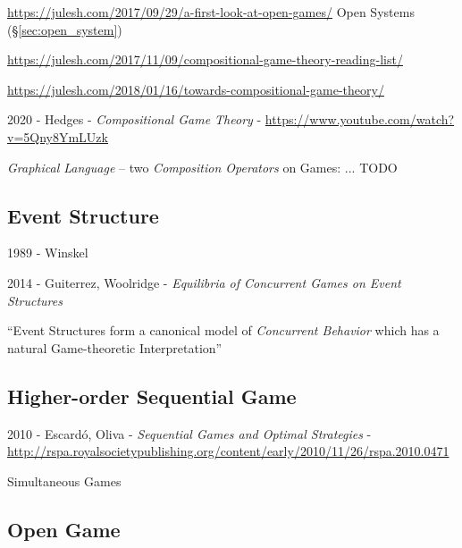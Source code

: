 \url{https://julesh.com/2017/09/29/a-first-look-at-open-games/} \fist Open
Systems (\S\ref{sec:open_system})

\url{https://julesh.com/2017/11/09/compositional-game-theory-reading-list/}


\url{https://julesh.com/2018/01/16/towards-compositional-game-theory/}

\asterism

2020 - Hedges - \emph{Compositional Game Theory} -
\url{https://www.youtube.com/watch?v=5Qny8YmLUzk}

\emph{Graphical Language} -- two \emph{Composition Operators} on Games: ... TODO



\subsection{Event Structure}\label{sec:event_structure}

1989 - Winskel

2014 - Guiterrez, Woolridge - \emph{Equilibria of Concurrent Games on Event
  Structures}

``Event Structures form a canonical model of \emph{Concurrent Behavior} which
has a natural Game-theoretic Interpretation''



\subsection{Higher-order Sequential Game}\label{sec:higherorder_sequential_game}

2010 - Escard\'o, Oliva - \emph{Sequential Games and Optimal Strategies} -
\url{http://rspa.royalsocietypublishing.org/content/early/2010/11/26/rspa.2010.0471}

Simultaneous Games



\subsection{Open Game}\label{sec:open_game}

